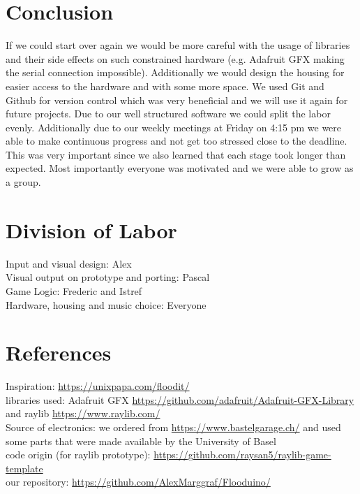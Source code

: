 \documentclass[12pt, a4paper]{article}
\begin{document}
\section*{Conclusion}
If we could start over again we would be more careful with the usage of libraries and their side effects on such constrained hardware (e.g. Adafruit GFX making the serial connection impossible). 
Additionally we would design the housing for easier access to the hardware and with some more space. 
We used Git and Github for version control which was very beneficial and we will use it again for future projects. 
Due to our well structured software we could split the labor evenly. Additionally due to our weekly meetings at Friday on 4:15 pm we were able to make continuous progress and not get too stressed close to the deadline. This was very important since we also learned that each stage took longer than expected. 
Most importantly everyone was motivated and we were able to grow as a group. 

\section*{Division of Labor}
Input and visual design: Alex \\
Visual output on prototype and porting: Pascal \\
Game Logic: Frederic and Istref \\
Hardware, housing and music choice: Everyone \\


\section*{References}
Inspiration: \url{https://unixpapa.com/floodit/} \\
libraries used: Adafruit GFX \url{https://github.com/adafruit/Adafruit-GFX-Library} and raylib \url{https://www.raylib.com/} \\
Source of electronics: we ordered from \url{https://www.bastelgarage.ch/} and used some parts that were made available by the University of Basel \\
code origin (for raylib prototype): \url{https://github.com/raysan5/raylib-game-template}\\
our repository: \url{https://github.com/AlexMarggraf/Flooduino/}


\printbibliography
\end{document}
